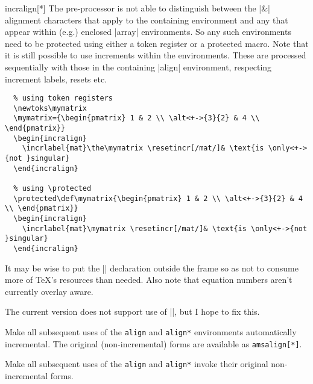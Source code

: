 \documentclass[a4paper]{ltxdoc}
\begin{document}
\begin{environment}{{incralign[*]}}
    The pre-processor is not able to distinguish between the |&| alignment
    characters that apply to the containing environment and any that appear
    within (e.g.) enclosed |array| environments.  So any such environments need
    to be protected using either a token register or a protected macro.  Note
    that it is still possible to use increments within the environments. These
    are processed sequentially with those in the containing |align| environment,
    respecting increment labels, resets etc.

    \example
\begin{verbatim}
  % using token registers
  \newtoks\mymatrix
  \mymatrix={\begin{pmatrix} 1 & 2 \\ \alt<+->{3}{2} & 4 \\ \end{pmatrix}}
  \begin{incralign}
    \incrlabel{mat}\the\mymatrix \resetincr[/mat/]& \text{is \only<+->{not }singular}
  \end{incralign}

  % using \protected
  \protected\def\mymatrix{\begin{pmatrix} 1 & 2 \\ \alt<+->{3}{2} & 4 \\ \end{pmatrix}}
  \begin{incralign}
    \incrlabel{mat}\mymatrix \resetincr[/mat/]& \text{is \only<+->{not }singular}
  \end{incralign}

\end{verbatim}
    It may be wise to put the |\newtoks| declaration outside the frame so as not
    to consume more of \TeX's resources than needed.  Also note that equation
    numbers aren't currently overlay aware.

    The current version does not support use of |\intertext|, but I hope to fix this.
\end{environment}



\begin{command}{\makealignincremental}
  Make all subsequent uses of the \texttt{align} and \texttt{align*}
  environments automatically incremental.  The original (non-incremental) forms
  are available as \texttt{amsalign[*]}.
\end{command}

\begin{command}{\makealignams}
  Make all subsequent uses of the \texttt{align} and \texttt{align*} invoke
  their original non-incremental forms.  
\end{command}
\end{document}
